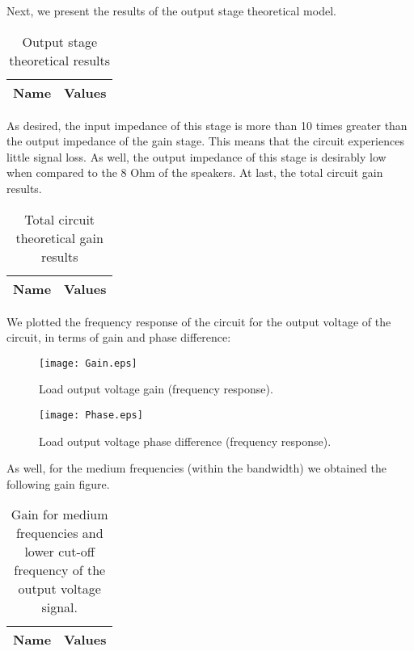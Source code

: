 Next, we present the results of the output stage theoretical model.
\begin{table}[h]
  \centering
  \begin{tabular}{|l|r|}
    \hline    
    {\bf Name} & {\bf Values} \\ \hline
     
  \end{tabular}
  \caption{Output stage theoretical results}
  \label{tab:output}
\end{table}
\pagebreak

As desired, the input impedance of this stage is more than 10 times greater than the output impedance of the gain stage. This means that the circuit experiences little signal loss. As well, the output impedance of this stage is desirably low when compared to the 8 Ohm of the speakers.
At last, the total circuit gain results.

\begin{table}[h]
  \centering
  \begin{tabular}{|l|r|}
    \hline    
    {\bf Name} & {\bf Values} \\ \hline
     
  \end{tabular}
  \caption{Total circuit theoretical gain results}
  \label{tab:output}
\end{table}

We plotted the frequency response of the circuit for the output voltage of the circuit, in terms of gain and phase difference:

\begin{figure}[!h] \centering
\texttt{[image: Gain.eps]}
\caption{Load output voltage gain (frequency response).}
\label{fig:gainfreq}
\end{figure}

\begin{figure}[!h] \centering
\texttt{[image: Phase.eps]}
\caption{Load output voltage phase difference (frequency response).}
\label{fig:phasefreq}
\end{figure}


As well, for the medium frequencies (within the bandwidth) we obtained the following gain figure.

\begin{table}[h]
  \centering
  \begin{tabular}{|l|r|}
    \hline    
    {\bf Name} & {\bf Values} \\ \hline
     
  \end{tabular}
  \caption{Gain for medium frequencies and lower cut-off frequency of the output voltage signal.}
  \label{tab:freq}
\end{table}
